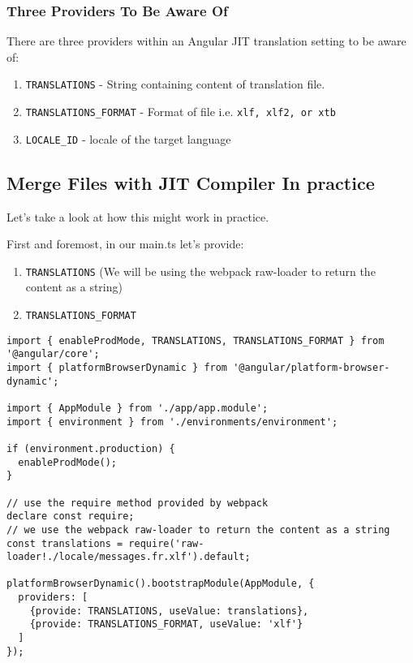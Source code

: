 \subsubsection{ Three Providers To Be Aware Of }
There are three providers within an Angular JIT translation setting to be aware 
of:
\begin{enumerate}
  \item \lstinline{TRANSLATIONS} - String containing content of translation file.
  \item \lstinline{TRANSLATIONS_FORMAT} - Format of file i.e. \lstinline{xlf, xlf2, or xtb}
  \item \lstinline{LOCALE_ID} - locale of the target language
\end{enumerate}

\subsection{Merge Files with JIT Compiler In practice}
Let's take a look at how this might work in practice. 

First and foremost, in our main.ts let's provide:
\begin{enumerate}
  \item \lstinline{TRANSLATIONS} (We will be using the webpack raw-loader to
  return the content as a string)
  \item \lstinline{TRANSLATIONS_FORMAT}
\end{enumerate}

\begin{lstlisting}[caption=src/main.ts]
import { enableProdMode, TRANSLATIONS, TRANSLATIONS_FORMAT } from '@angular/core';
import { platformBrowserDynamic } from '@angular/platform-browser-dynamic';

import { AppModule } from './app/app.module';
import { environment } from './environments/environment';

if (environment.production) {
  enableProdMode();
}

// use the require method provided by webpack
declare const require;
// we use the webpack raw-loader to return the content as a string
const translations = require('raw-loader!./locale/messages.fr.xlf').default;

platformBrowserDynamic().bootstrapModule(AppModule, {
  providers: [
    {provide: TRANSLATIONS, useValue: translations},
    {provide: TRANSLATIONS_FORMAT, useValue: 'xlf'}
  ]
});  
\end{lstlisting}

